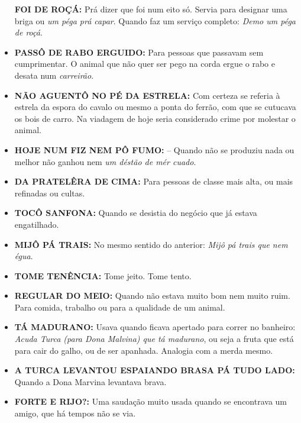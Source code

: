 \documentclass[12pt,brazil,]{book}
\begin{document}
\begin{itemize}
  \textbf{FOI DE ROÇÁ:} Prá dizer que foi num eito só. Servia para
  designar uma briga ou \emph{um péga prá capar}. Quando faz um serviço
  completo: \emph{Demo um péga de roçá}.\\
\item
  \textbf{PASSÔ DE RABO ERGUIDO:} Para pessoas que passavam sem
  cumprimentar. O animal que não quer ser pego na corda ergue o rabo e
  desata num \emph{carreirão}.\\
\item
  \textbf{NÃO AGUENTÔ NO PÉ DA ESTRELA:} Com certeza se referia à
  estrela da espora do cavalo ou mesmo a ponta do ferrão, com que se
  cutucava os bois de carro. Na viadagem de hoje seria considerado crime
  por molestar o animal.\\
\item
  \textbf{HOJE NUM FIZ NEM PÔ FUMO:} -- Quando não se produziu nada ou
  melhor não ganhou nem \emph{um déstão de mér cuado}.\\
\item
  \textbf{DA PRATELÊRA DE CIMA:} Para pessoas de classe mais alta, ou
  mais refinadas ou cultas.\\
\item
  \textbf{TOCÔ SANFONA:} Quando se desistia do negócio que já estava
  engatilhado.\\
\item
  \textbf{MIJÔ PÁ TRAIS:} No mesmo sentido do anterior: \emph{Mijô pá
  trais que nem égua}.\\
\item
  \textbf{TOME TENÊNCIA:} Tome jeito. Tome tento.\\
\item
  \textbf{REGULAR DO MEIO:} Quando não estava muito bom nem muito ruim.
  Para comida, trabalho ou para a qualidade de um animal.\\
\item
  \textbf{TÁ MADURANO:} Usava quando ficava apertado para correr no
  banheiro: \emph{Acuda Turca (para Dona Malvina) que tá madurano}, ou
  seja a fruta que está para cair do galho, ou de ser apanhada. Analogia
  com a merda mesmo.\\
\item
  \textbf{A TURCA LEVANTOU ESPAIANDO BRASA PÁ TUDO LADO:} Quando a Dona
  Marvina levantava brava.\\
\item
  \textbf{FORTE E RIJO?:} Uma saudação muito usada quando se encontrava
  um amigo, que há tempos não se via.\\

\end{itemize}
\end{document}
